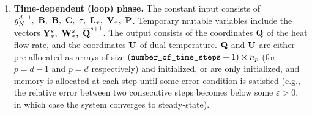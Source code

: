 \begin{algorithm}
\begin{enumerate}
\begin{itemize}
          $\overline{\bf Q}^{s + 1} \in \R^{\abs{\overline{J}}}$.
      \end{itemize}
    \item
      \textbf{Time-dependent (loop) phase.}
      The constant input consists of
      $g_N^{d - 1},\ {\bf B},\ \overline{\bf B},\ {\bf C},\ \tau,\
      {\bf L}_\tau,\ {\bf V}_\tau,\ \overline{\bf P}$.
      Temporary mutable variables include the vectors
      ${\bf Y}_\tau^s,\ {\bf W}_\tau^s,\ \overline{\bf Q}^{s + 1}$.
      The output consists of the coordinates ${\bf Q}$ of the heat flow rate,
      and the coordinates ${\bf U}$ of dual temperature.
      ${\bf Q}$ and ${\bf U}$ are either pre-allocated as arrays of size
      $(\verb|number_of_time_steps| + 1) \times n_p$
      (for $p = d - 1$ and $p = d$ respectively) and initialized,
      or are only initialized, and memory is allocated at each step until some
      error condition is satisfied
      (e.g., the relative error between two consecutive steps becomes below some
      $\varepsilon > 0$, in which case the system converges to steady-state).


\end{enumerate}
\end{algorithm}
